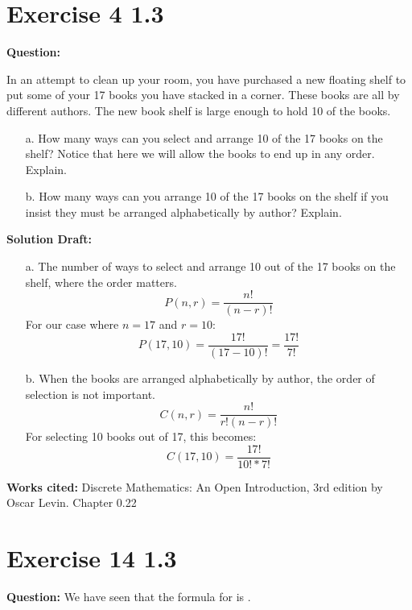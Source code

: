 \documentclass{article}
\begin{document}
\section*{Exercise 4 1.3}  


\vspace{0.5cm} %
\noindent\textbf{Question:} 



In an attempt to clean up your room, you have purchased a new floating shelf to put some of your 17 books you have stacked in a corner. These books are all by different authors. The new book shelf is large enough to hold 10 of the books.
\begin{enumerate}
    \item[a.]How many ways can you select and arrange 10 of the 17 books on the shelf? Notice that here we will allow the books to end up in any order. Explain.

    \item[b.]How many ways can you arrange 10 of the 17 books on the shelf if you insist they must be arranged alphabetically by author? Explain.
\end{enumerate}

\noindent\textbf{Solution Draft:} 
\begin{enumerate}

\item[a.]The number of ways to select and arrange 10 out of the 17 books on the shelf, where the order matters.
\[
P(n, r) = \frac{n!}{(n-r)!}
\]
For our case where \( n = 17 \) and \( r = 10 \):
\[
P(17, 10) = \frac{17!}{(17-10)!} = \frac{17!}{7!}
\]

\item[b.]When the books are arranged alphabetically by author, the order of selection is not important.
\[
C(n, r) = \frac{n!}{r!(n-r)!}
\]
For selecting 10 books out of 17, this becomes:
\[
C(17, 10) = \frac{17!}{10! * 7!}
\]
\end{enumerate}

\vspace{0.5cm}
\textbf{Works cited:}
Discrete Mathematics: An Open Introduction, 3rd edition by Oscar Levin. Chapter 0.22
\section*{Exercise 14 1.3}  


\vspace{0.5cm} %
\noindent\textbf{Question:} 
We have seen that the formula for is
.
\end{document}
